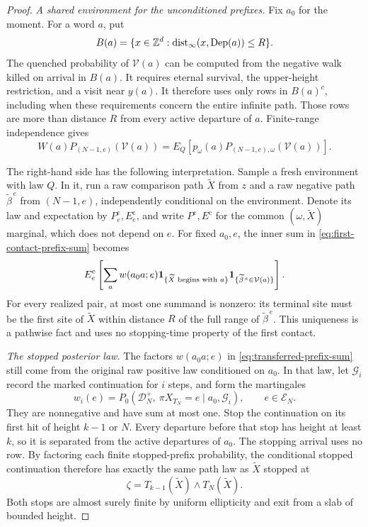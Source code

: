 \begin{proof}
\emph{A shared environment for the unconditioned prefixes.}
Fix \(a_0\) for the moment.  For a word \(a\), put
\[
 B(a)=\{x\in\mathbb Z^d:\operatorname{dist}_\infty(x,\operatorname{Dep}(a))\le R\}.
\]
The quenched probability of \(\mathcal V(a)\) can be computed from
the negative walk killed on arrival in \(B(a)\).  It requires eternal
survival, the upper-height restriction, and a visit near \(y(a)\).
It therefore uses only rows in \(B(a)^c\), including when these
requirements concern the entire infinite path.  Those rows are more
than distance \(R\) from every active departure of \(a\).
Finite-range independence gives
\begin{equation}\label{eq:first-contact-transfer}
 W(a)P_{(N-1,e)}(\mathcal V(a))
 =E_Q\left[p_\omega(a)
           P_{(N-1,e),\omega}(\mathcal V(a))\right].
\end{equation}

The right-hand side has the following interpretation.  Sample a fresh
environment with law \(Q\).  In it, run a raw comparison path
\(\widetilde X\) from \(z\) and a raw negative path
\(\widetilde\beta^{\,e}\) from \((N-1,e)\), independently
conditional on the environment.  Denote its law and expectation by
\(P_e^{\mathrm c},E_e^{\mathrm c}\), and write
\(P^{\mathrm c},E^{\mathrm c}\) for the common
\((\omega,\widetilde X)\) marginal, which does not depend on \(e\).
For fixed \(a_0,e\), the inner sum in
\eqref{eq:first-contact-prefix-sum} becomes
\begin{equation}\label{eq:transferred-prefix-sum}
 E_e^{\mathrm c}\left[
  \sum_a w(a_0a;e)
  \mathbf 1_{\{\widetilde X\text{ begins with }a\}}
  \mathbf 1_{\{\widetilde\beta^{\,e}\in\mathcal V(a)\}}
 \right].
\end{equation}
For every realized pair, at most one summand is nonzero: its terminal
site must be the first site of \(\widetilde X\) within distance
\(R\) of the full range of \(\widetilde\beta^{\,e}\).
This uniqueness is a pathwise fact and uses no stopping-time property
of the first contact.

\emph{The stopped posterior law.}
The factors \(w(a_0a;e)\) in
\eqref{eq:transferred-prefix-sum} still come from the original raw
positive law conditioned on \(a_0\).  In that law, let
\(\mathcal G_i\) record the marked continuation for \(i\) steps,
and form the martingales
\[
 w_i(e)=P_0(\mathcal D_N^+,\ \pi X_{T_N}=e
                  \mid a_0,\mathcal G_i),
 \qquad e\in\mathcal E_N.
\]
They are nonnegative and have sum at most one.  Stop the continuation
on its first hit of height \(k-1\) or \(N\).  Every departure before
that stop has height at least \(k\), so it is separated from the
active departures of \(a_0\).  The stopping arrival uses no row.
By factoring each finite stopped-prefix probability, the conditional
stopped continuation therefore has exactly the same path law as
\(\widetilde X\) stopped at
\[
 \zeta=T_{k-1}(\widetilde X)\wedge T_N(\widetilde X).
\]
Both stops are almost surely finite by uniform ellipticity and exit
from a slab of bounded height.


\end{proof}
